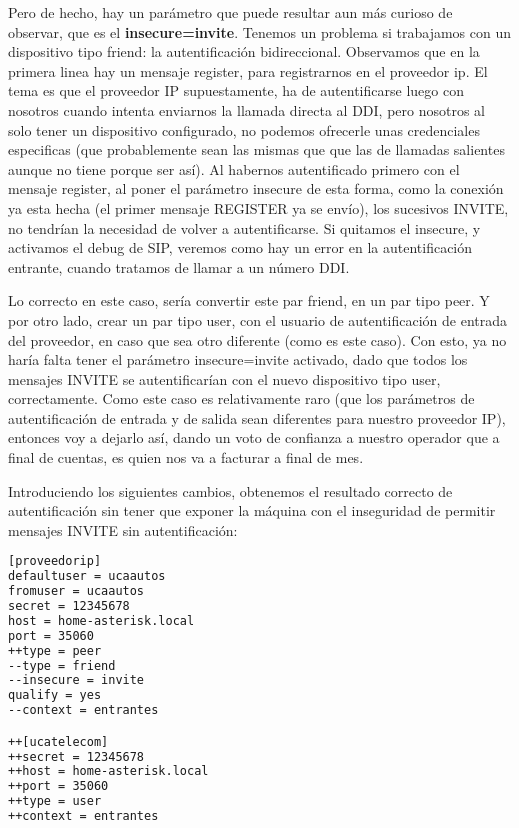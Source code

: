 Pero de hecho, hay un parámetro que puede resultar aun más curioso de observar, que es el \textbf{insecure=invite}. Tenemos un problema si trabajamos con un dispositivo tipo friend: la autentificación bidireccional. Observamos que en la primera linea hay un mensaje register, para registrarnos en el proveedor ip. El tema es que el proveedor IP supuestamente, ha de autentificarse luego con nosotros cuando intenta enviarnos la llamada directa al DDI, pero nosotros al solo tener un dispositivo configurado, no podemos ofrecerle unas credenciales especificas (que probablemente sean las mismas que que las de llamadas salientes aunque no tiene porque ser así). Al habernos autentificado primero con el mensaje register, al poner el parámetro insecure de esta forma, como la conexión ya esta hecha (el primer mensaje REGISTER ya se envío), los sucesivos INVITE, no tendrían la necesidad de volver a autentificarse. Si quitamos el insecure, y activamos el debug de SIP, veremos como hay un error en la autentificación entrante, cuando tratamos de llamar a un número DDI.

Lo correcto en este caso, sería convertir este par friend, en un par tipo peer. Y por otro lado, crear un par tipo user, con el usuario de autentificación de entrada del proveedor, en caso que sea otro diferente (como es este caso). Con esto, ya no haría falta tener el parámetro insecure=invite activado, dado que todos los mensajes INVITE se autentificarían con el nuevo dispositivo tipo user, correctamente. Como este caso es relativamente raro (que los parámetros de autentificación de entrada y de salida sean diferentes para nuestro proveedor IP), entonces voy a dejarlo así, dando un voto de confianza a nuestro operador que a final de cuentas, es quien nos va a facturar a final de mes.

Introduciendo los siguientes cambios, obtenemos el resultado correcto de autentificación sin tener que exponer la máquina con el inseguridad de permitir mensajes INVITE sin autentificación:

\begin{lstlisting}[language=bash,title={/etc/asterisk/sip.conf}]
[proveedorip]
defaultuser = ucaautos
fromuser = ucaautos
secret = 12345678
host = home-asterisk.local
port = 35060
++type = peer
--type = friend
--insecure = invite
qualify = yes
--context = entrantes

++[ucatelecom]
++secret = 12345678
++host = home-asterisk.local
++port = 35060
++type = user
++context = entrantes
\end{lstlisting}

